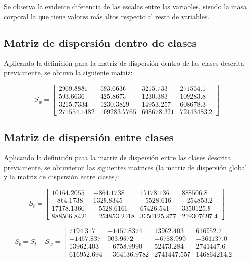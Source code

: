 \documentclass[11pt, letterpaper]{article}
\begin{document}
Se observa la evidente diferencia de las escalas entre las variables, siendo la masa corporal la que tiene valores más altos respecto al resto de variables.

\subsection{Matriz de dispersión dentro de clases}

Aplicando la definición para la matriz de dispersión dentro de las clases descrita previamente, se obtuvo la siguiente matriz:

$$
S_w = 
\begin{bmatrix}
2969.8881 & 593.6636 & 3215.733 & 271554.1 \\
593.6636 & 425.8673 & 1230.383 & 109283.8 \\
3215.7334 & 1230.3829 & 14953.257 & 608678.3 \\
271554.1482 & 109283.7765 & 608678.321 & 72443483.2
\end{bmatrix}
$$

\newpage

\subsection{Matriz de dispersión entre clases}

Aplicando la definición para la matriz de dispersión entre las clases descrita previamente, se obtuvieron las siguientes matrices (la matriz de dispersión global y la matriz de dispersión entre clases):

$$
S_t = 
\begin{bmatrix}
10164.2055 & -864.1738 & 17178.136 & 888506.8 \\
-864.1738 & 1329.8345 & -5528.616 & -254853.2 \\
17178.1360 & -5528.6161 & 67426.541 & 3350125.9 \\
888506.8421 & -254853.2018 & 3350125.877 & 219307697.4
\end{bmatrix}
$$

$$
S_b = S_t-S_w = 
\begin{bmatrix}
7194.317 & -1457.8374 & 13962.403 & 616952.7 \\
-1457.837 & 903.9672 & -6758.999 & -364137.0 \\
13962.403 & -6758.9990 & 52473.284 & 2741447.6 \\
616952.694 & -364136.9782 & 2741447.557 & 146864214.2
\end{bmatrix}
$$
\end{document}
